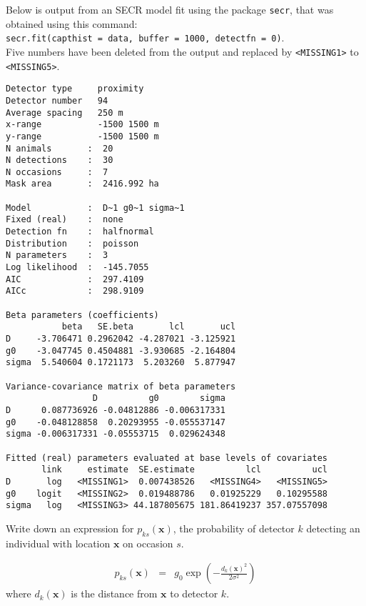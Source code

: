 \begin{questions}
\item Below is output from an SECR model fit using the package \verb|secr|, that was obtained using this command: \\
\verb|secr.fit(capthist = data, buffer = 1000, detectfn = 0)|.\\
Five numbers have been deleted from the output and replaced by \verb|<MISSING1>| to \verb|<MISSING5>|.
\begin{verbatim}
Detector type     proximity 
Detector number   94 
Average spacing   250 m 
x-range           -1500 1500 m 
y-range           -1500 1500 m 
N animals       :  20  
N detections    :  30 
N occasions     :  7 
Mask area       :  2416.992 ha 

Model           :  D~1 g0~1 sigma~1 
Fixed (real)    :  none 
Detection fn    :  halfnormal
Distribution    :  poisson 
N parameters    :  3 
Log likelihood  :  -145.7055 
AIC             :  297.4109 
AICc            :  298.9109 

Beta parameters (coefficients) 
           beta   SE.beta       lcl       ucl
D     -3.706471 0.2962042 -4.287021 -3.125921
g0    -3.047745 0.4504881 -3.930685 -2.164804
sigma  5.540604 0.1721173  5.203260  5.877947

Variance-covariance matrix of beta parameters 
                 D          g0        sigma
D      0.087736926 -0.04812886 -0.006317331
g0    -0.048128858  0.20293955 -0.055537147
sigma -0.006317331 -0.05553715  0.029624348

Fitted (real) parameters evaluated at base levels of covariates 
       link     estimate  SE.estimate          lcl          ucl
D       log   <MISSING1>  0.007438526   <MISSING4>   <MISSING5>
g0    logit   <MISSING2>  0.019488786   0.01925229   0.10295588
sigma   log   <MISSING3> 44.187805675 181.86419237 357.07557098
\end{verbatim}

\begin{parts}

\item Write down an expression for $p_{ks}(\mathbf{x})$, the probability of detector $k$ detecting an individual with location $\mathbf{x}$ on occasion $s$.

{\begin{solution}
\begin{eqnarray}
p_{ks}(\mathbf{x})&=&
g_0\exp\left(-\frac{d_k(\mathbf{x})^2}{2\sigma^2}\right)
\end{eqnarray}
\noindent
where $d_k(\mathbf{x})$ is the distance from $\mathbf{x}$ to detector $k$.


\end{solution}}
\end{parts}
\end{questions}
